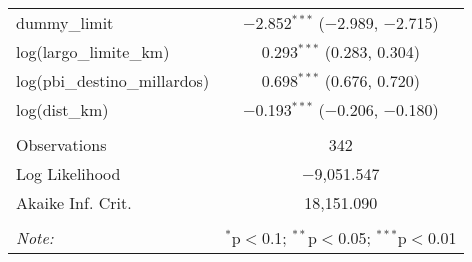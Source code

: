 \begin{table}[H]
\begin{tabular}{@{\extracolsep{5pt}}lc}
  dummy\_limit & $-$2.852$^{***}$ ($-$2.989, $-$2.715) \\ 
  log(largo\_limite\_km) & 0.293$^{***}$ (0.283, 0.304) \\ 
  log(pbi\_destino\_millardos) & 0.698$^{***}$ (0.676, 0.720) \\ 
  log(dist\_km) & $-$0.193$^{***}$ ($-$0.206, $-$0.180) \\ 
 \hline \\[-1.8ex] 
Observations & 342 \\ 
Log Likelihood & $-$9,051.547 \\ 
Akaike Inf. Crit. & 18,151.090 \\ 
\hline 
\hline \\[-1.8ex] 
\textit{Note:}  & \multicolumn{1}{r}{$^{*}$p$<$0.1; $^{**}$p$<$0.05; $^{***}$p$<$0.01} \\ 
\end{tabular} 
\end{table} 
